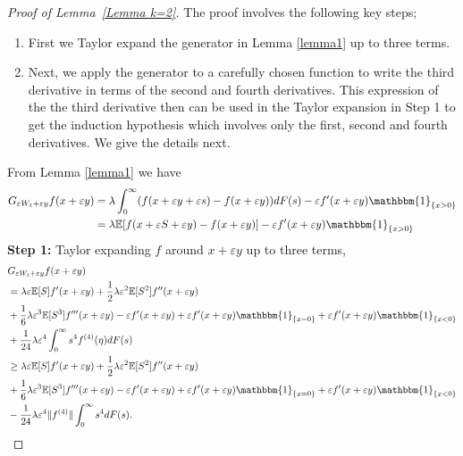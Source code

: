 \documentclass[10pt,a4paper]{amsart}
\begin{document}
\begin{proof}[Proof of Lemma~\ref{Lemma k=2}]
 The proof involves the following key steps;
\begin{enumerate}
    \item First we Taylor expand the generator in Lemma \ref{lemma1} up to three terms.
    \item Next, we apply the generator to a carefully chosen function to write the third derivative in terms of the second and fourth derivatives. 
    This expression of the the third derivative then can be used in the Taylor expansion in Step 1  to get the induction hypothesis which involves only the first, second and fourth derivatives. We give the details next.
\end{enumerate}
From Lemma \ref{lemma1} we have 
\begin{align*}
     G_{\varepsilon W_t+\varepsilon y}f(x+\varepsilon y)
     &= \lambda \int_0^\infty (f(x+\varepsilon y +\varepsilon s)-f(x+\varepsilon y))dF(s)-\varepsilon f'(x+\varepsilon y)\mathbbm{1}_{\{x>0\}}\\
     &= \lambda \mathbb E[f(x+\varepsilon S+\varepsilon y)-f(x+\varepsilon y)]-\varepsilon f'(x+\varepsilon y)\mathbbm{1}_{\{x>0\}}
\end{align*}
\textbf{Step 1:} Taylor expanding $f$ around $x+\varepsilon y$ up to three terms,
\begin{align} \label{eqcomb1}
       &G_{\varepsilon W_t+\varepsilon y}f(x+\varepsilon y) \nonumber \\ 
       &=\lambda \varepsilon \mathbb E[S]f'(x+\varepsilon y)+\frac{1}{2}\lambda \varepsilon^2 \mathbb E[S^2]f''(x+\varepsilon y)\nonumber \\
     &+\frac{1}{6}\lambda \varepsilon^3 \mathbb E[S^3]f'''(x+\varepsilon y)-\varepsilon f'(x+\varepsilon y)+\varepsilon f'(x+\varepsilon y)\mathbbm{1}_{\{x=0\}}+\varepsilon f'(x+\varepsilon y)\mathbbm{1}_{\{x<0\}}\nonumber \\
     &+\frac{1}{24}\lambda \varepsilon^4 \int_0^\infty s^4 f^{(4)}(\eta)dF(s)\nonumber \\
     &\geq \lambda \varepsilon \mathbb E[S]f'(x+\varepsilon y)+\frac{1}{2}\lambda \varepsilon^2 \mathbb E[S^2]f''(x+\varepsilon y)\nonumber \\
     &+\frac{1}{6}\lambda \varepsilon^3 \mathbb E[S^3]f'''(x+\varepsilon y)-\varepsilon f'(x+\varepsilon y)+\varepsilon f'(x+\varepsilon y)\mathbbm{1}_{\{x=0\}}+\varepsilon f'(x+\varepsilon y)\mathbbm{1}_{\{x<0\}}\nonumber \\
     &-\frac{1}{24}\lambda \varepsilon^4  \|f^{(4)}\|\int_0^\infty s^4 dF(s).

\end{align}
\end{proof}
\end{document}
